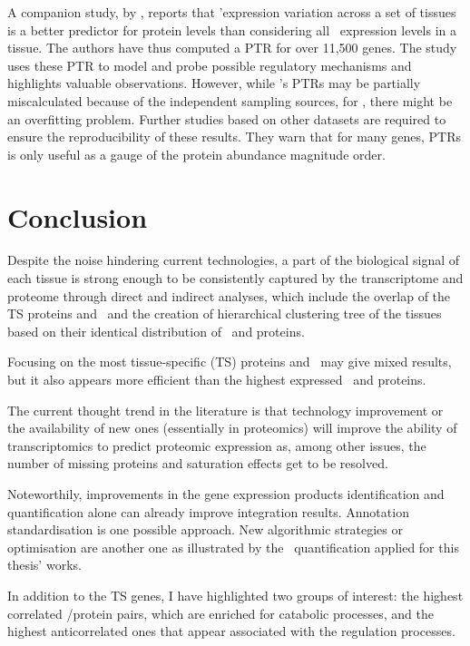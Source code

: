 A companion study, by \citet{Eraslan2019-md}, reports that
\mRNAs{}'expression variation across a set of tissues is
a better predictor for protein levels than
considering all \mRNAs\ expression levels in a tissue.
The authors have thus computed a \gls{PTR} for over 11,500 genes.
The study uses these \gls{PTR} to model and probe possible regulatory mechanisms
and highlights valuable observations.
However, while \citet{Franks2017-bp}'s \glspl{PTR} may be partially miscalculated
because of the independent sampling sources,
for \citet{Eraslan2019-md}, there might be an overfitting problem.
Further studies based on other datasets are required
to ensure the reproducibility of these results.
They warn that for many genes,
\glspl{PTR} is only useful as a gauge of the protein abundance magnitude order.

\section{Conclusion}

Despite the noise hindering current technologies,
a part of the biological signal of each tissue
is strong enough to be consistently captured
by the transcriptome and proteome
through direct and indirect analyses,
which include the overlap of the \gls{TS} proteins and \mRNAs\
and the creation of hierarchical clustering tree of the tissues based
on their identical distribution of \mRNAs\ and proteins.

Focusing on the most tissue-specific (\gls{TS}) proteins and \mRNAs\
may give mixed results,
but it also appears more efficient than the highest expressed \mRNAs\ and proteins.

The current thought trend in the literature is that
technology improvement or the availability of new ones
(essentially in proteomics)
will improve the ability of transcriptomics to predict proteomic expression
as, among other issues,
the number of missing proteins and saturation effects get to be resolved.\mybr\

Noteworthily, improvements
in the gene expression products identification and quantification alone
can already improve integration results.
Annotation standardisation is one possible approach.
New algorithmic strategies or optimisation are another one
as illustrated by the \PPKM\ quantification applied for this thesis' works.\mybr\

In addition to the \gls{TS} genes,
I have highlighted two groups of interest:
the highest correlated \mRNA/protein pairs,
which are enriched for catabolic processes,
and the highest anticorrelated ones
that appear associated with the regulation processes.

